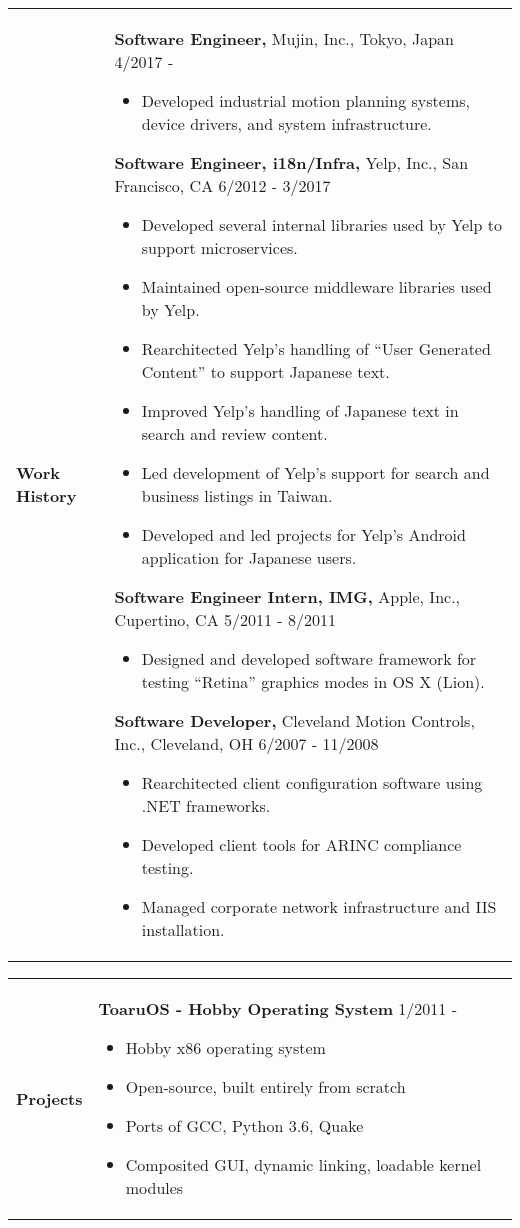 \documentclass[11pt,a4paper]{article}
\begin{document}
\begin{CJK}{UTF8}{goth}
\begin{tabularx}{\textwidth}{ p{20mm} X}
	\textbf{Work} \newline \textbf{History} &
	{\bf Software Engineer,} Mujin, Inc., Tokyo, Japan \hfill {\scriptsize 4/2017 -}
	\begin{itemize}[noitemsep,nolistsep]
		\item Developed industrial motion planning systems, device drivers, and system infrastructure.
	\end{itemize}
	{\bf Software Engineer, i18n/Infra,} Yelp, Inc., San Francisco, CA \hfill {\scriptsize 6/2012 - 3/2017}
	\begin{itemize}[noitemsep,nolistsep]
		\item Developed several internal libraries used by Yelp to support microservices.
		\item Maintained open-source middleware libraries used by Yelp.
		\item Rearchitected Yelp's handling of ``User Generated Content'' to support Japanese text.
		\item Improved Yelp's handling of Japanese text in search and review content.
		\item Led development of Yelp's support for search and business listings in Taiwan.
		\item Developed and led projects for Yelp's Android application for Japanese users.
	\end{itemize}
	{\bf Software Engineer Intern, IMG,} Apple, Inc., Cupertino, CA \hfill {\scriptsize 5/2011 - 8/2011}
	\begin{itemize}[noitemsep,nolistsep]
		\item Designed and developed software framework for testing ``Retina'' graphics modes in OS X (Lion).
	\end{itemize}
	{\bf Software Developer,} Cleveland Motion Controls, Inc., Cleveland, OH \hfill {\scriptsize 6/2007 - 11/2008}
	\begin{itemize}[noitemsep,nolistsep]
		\item Rearchitected client configuration software using .NET frameworks.
		\item Developed client tools for ARINC compliance testing.
		\item Managed corporate network infrastructure and IIS installation.
	\end{itemize}
\end{tabularx}

\begin{tabularx}{\textwidth}{ p{20mm} X}
	\textbf{Projects} &
	{\bf ToaruOS - Hobby Operating System} \hfill {\scriptsize 1/2011 -}
	\begin{itemize}[noitemsep,nolistsep]
		\item Hobby x86 operating system
		\item Open-source, built entirely from scratch
		\item Ports of GCC, Python 3.6, Quake
		\item Composited GUI, dynamic linking, loadable kernel modules
	\end{itemize}
\end{tabularx}


\end{CJK}
\end{document}
